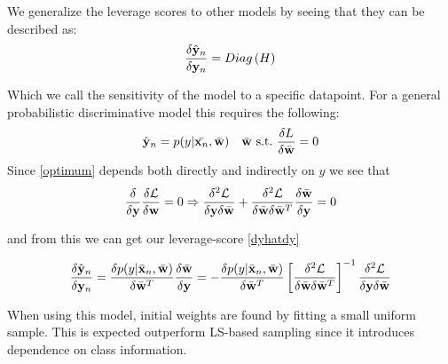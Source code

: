 We generalize the leverage scores to other models by seeing that they can be described as: 
	    \begin{equation}
	    \label{dyhatdy}
	    \frac{\delta \hat{{\bf y}}_n}{\delta {\bf y}_n} = Diag\left(H\right)
	    \end{equation}

Which we call the sensitivity of the model to a specific datapoint. For a general probabilistic discriminative model this requires the following:
    	\begin{equation}
    	 \hat{{\bf y}}_n = p(y|\bar{{\bf x}_n},\bar{{\bf w}}) \quad \bar{{\bf w}} \  \text{s.t.} \ \frac{\delta L}{\delta\bar{{\bf w}}}=0     	\label{optimum}
    	\end{equation}
Since \ref{optimum} depends both directly and indirectly on $y$ we see that
    	\begin{equation}
    	\frac{\delta}{\delta {\bf y}} \frac{\delta \mathcal{L}}{\delta {\bf w}} = 0 
    	\Rightarrow
    	\frac{\delta^2 \mathcal{L}}{\delta {\bf y} \delta \bar{{\bf w}}} + \frac{\delta^2 \mathcal{L}}{\delta \bar{{\bf w}} \delta \bar{{\bf w}}^T} \frac{\delta \bar{{\bf w}}}{\delta {\bf y}}= 0
    	\end{equation}
    	
    	and from this we can get our leverage-score \eqref{dyhatdy}
    	
    	\begin{equation*}
    		\frac{\delta \hat{{\bf y}}_n}{\delta {\bf y}_n}=\frac{\delta p(y|\bar{{\bf x}}_n,\bar{{\bf w}})}{\delta \bar{{\bf w}}^T} \frac{\delta \bar{{\bf w}}}{\delta {\bf y}} = - \frac{\delta p(y|\bar{{\bf x}}_n,\bar{{\bf w}})}{\delta \bar{{\bf w}}^T} \left[ \frac{\delta^2 \mathcal{L}}{\delta \bar{{\bf w}} \delta \bar{{\bf w}}^T} \right]^{-1} \frac{\delta^2 \mathcal{L}}{\delta {\bf y} \delta \bar{{\bf w}}}
    	\end{equation*}
    	
    	When using this model, initial weights are found by fitting a small uniform sample. This is expected outperform LS-based sampling since it introduces dependence on class information.
%
